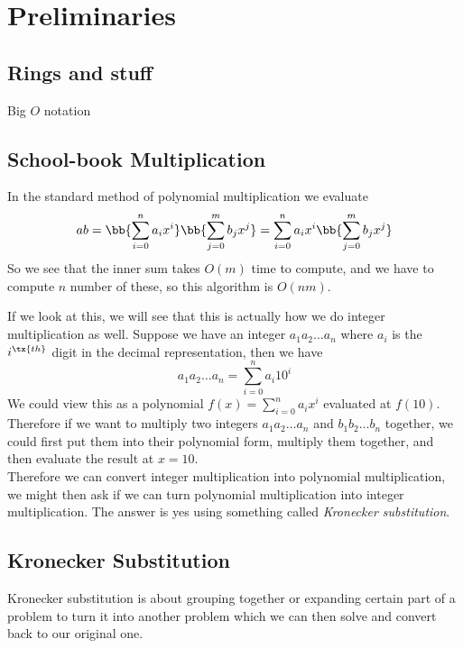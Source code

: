 \chapter{Preliminaries}\label{preliminaries}

\section{Rings and stuff}
\label{sec:prelim-rings}

Big $O$ notation 
\section{School-book Multiplication}
\label{sec:prelim-schoolbook}

In the standard method of polynomial multiplication we evaluate
\[
    ab = \bb{\sum^n_{i=0} a_i x^i}\bb{\sum^m_{j=0} b_j x^j} = \sum^n_{i=0} a_ix^i\bb{\sum^m_{j=0} b_j x^j}
\]
So we see that the inner sum takes $O(m)$ time to compute, and we have to compute $n$ number of these, so this algorithm is $O(nm)$.

If we look at this, we will see that this is actually how we do integer multiplication as well. Suppose we have an integer $a_1a_2 \ldots a_n$ where $a_i$ is the $i^\tx{th}$ digit in the decimal representation, then we have
\[
    a_1a_2 \ldots a_n = \sum^n_{i=0} a_i 10^i
\]
We could view this as a polynomial $f(x)= \sum^n_{i=0} a_i x^i$ evaluated at $f(10)$. Therefore if we want to multiply two integers $a_1a_2\ldots a_n$ and $b_1 b_2 \ldots b_n$ together, we could first put them into their polynomial form, multiply them together, and then evaluate the result at $x = 10$.\\

Therefore we can convert integer multiplication into polynomial multiplication, we might then ask if we can turn polynomial multiplication into integer multiplication. The answer is yes using something called \emph{Kronecker substitution}. 

\section{Kronecker Substitution}%
\label{sub:kronecker_substitution}

Kronecker substitution is about grouping together or expanding certain part of a problem to turn it into another problem which we can then solve and convert back to our original one. 

